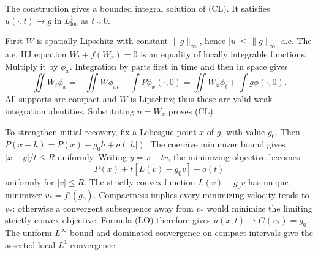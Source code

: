 \begin{theorem}
The construction gives a bounded integral solution of (CL).
It satisfies $u(\cdot,t)\to g$ in $L^1_{\mathrm{loc}}$ as $t\downarrow0$.
\end{theorem}
\begin{expandedproof}
First $W$ is spatially Lipschitz with constant $\|g\|_\infty$, hence
$|u|\leq\|g\|_\infty$ a.e.
The a.e. HJ equation $W_t+f(W_x)=0$ is an equality of locally integrable
functions. Multiply it by $\phi_x$.
Integration by parts first in time and then in space gives
\[
 \iint W_t\phi_x
 =-\iint W\phi_{xt}-\int P\phi_x(\cdot,0)
 =\iint W_x\phi_t+\int g\phi(\cdot,0).
\]
All supports are compact and $W$ is Lipschitz; thus these are valid
weak integration identities. Substituting $u=W_x$ proves (CL).

To strengthen initial recovery, fix a Lebesgue point $x$ of $g$,
with value $g_0$. Then
$P(x+h)=P(x)+g_0h+o(|h|)$.
The coercive minimizer bound gives $|x-y|/t\leq R$ uniformly.
Writing $y=x-tv$, the minimizing objective becomes
\[
 P(x)+t[L(v)-g_0v]+o(t)
\]
uniformly for $|v|\leq R$.
The strictly convex function $L(v)-g_0v$ has unique minimizer
$v_*=f'(g_0)$. Compactness implies every minimizing velocity tends
to $v_*$: otherwise a convergent subsequence away from $v_*$ would
minimize the limiting strictly convex objective.
Formula (LO) therefore gives $u(x,t)\to G(v_*)=g_0$.
The uniform $L^\infty$ bound and dominated convergence on compact
intervals give the asserted local $L^1$ convergence.
\end{expandedproof}



